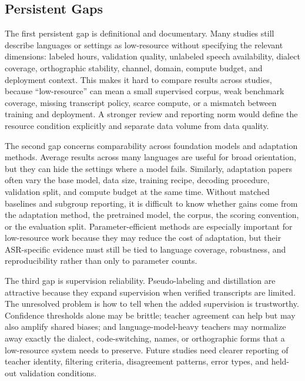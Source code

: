 \documentclass[pdflatex,sn-basic,iicol]{sn-jnl}
\theoremstyle{thmstyleone}
\theoremstyle{thmstyletwo}
\theoremstyle{thmstylethree}
\begin{document}
\subsection{Persistent Gaps}

The first persistent gap is definitional and documentary. Many studies still describe languages or settings as low-resource without specifying the relevant dimensions: labeled hours, validation quality, unlabeled speech availability, dialect coverage, orthographic stability, channel, domain, compute budget, and deployment context. This makes it hard to compare results across studies, because ``low-resource'' can mean a small supervised corpus, weak benchmark coverage, missing transcript policy, scarce compute, or a mismatch between training and deployment. A stronger review and reporting norm would define the resource condition explicitly and separate data volume from data quality.

The second gap concerns comparability across foundation models and adaptation methods. Average results across many languages are useful for broad orientation, but they can hide the settings where a model fails. Similarly, adaptation papers often vary the base model, data size, training recipe, decoding procedure, validation split, and compute budget at the same time. Without matched baselines and subgroup reporting, it is difficult to know whether gains come from the adaptation method, the pretrained model, the corpus, the scoring convention, or the evaluation split. Parameter-efficient methods are especially important for low-resource work because they may reduce the cost of adaptation, but their ASR-specific evidence must still be tied to language coverage, robustness, and reproducibility rather than only to parameter counts.

The third gap is supervision reliability. Pseudo-labeling and distillation are attractive because they expand supervision when verified transcripts are limited. The unresolved problem is how to tell when the added supervision is trustworthy. Confidence thresholds alone may be brittle; teacher agreement can help but may also amplify shared biases; and language-model-heavy teachers may normalize away exactly the dialect, code-switching, names, or orthographic forms that a low-resource system needs to preserve. Future studies need clearer reporting of teacher identity, filtering criteria, disagreement patterns, error types, and held-out validation conditions.
\end{document}
